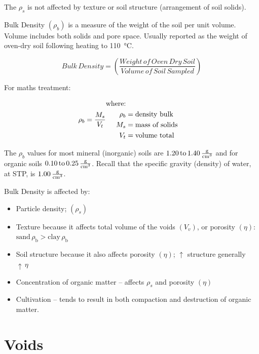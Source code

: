 \documentclass{book}
\begin{document}
The $\rho_s$ is not affected by texture or soil structure (arrangement of soil solids).

Bulk Density $\left(\rho_b\right)$ is a measure of the weight of the soil per unit volume. Volume includes both solids and pore space. Usually reported as the weight of oven-dry soil following heating to \qty{110}{\degreeCelsius}.

\begin{equation}
    Bulk\,Density = \left(\frac{Weight\,of\,Oven\,Dry\,Soil}{Volume\,of\,Soil\,Sampled}\right)
\end{equation}

For maths treatment:

\begin{equation}
    \rho_b = \frac{M_s}{V_t}\quad\\
    \begin{aligned}
    \text{where:}\\
        \rho_b &= \text{density bulk} \\
        M_s &= \text{mass of solids} \\
        V_t &= \text{volume total} \\
    \end{aligned}
\end{equation}

The $\rho_b$ values for most mineral (inorganic) soils are $\ce{1.20 to 1.40 \frac{g}{cm^3}}$ and for organic soils $\ce{0.10 to 0.25 \frac{g}{cm^3}}$. Recall that the specific gravity (density) of water, at STP, is $\ce{1.00 \frac{g}{cm^3}}$.

Bulk Density is affected by:
\begin{itemize}
    \item Particle density; $\left(\rho_s\right)$
    \item Texture because it affects total volume of the voids $\left(V_v\right)$, or porosity $\left(\eta\right)$:  $\text{sand}\,\rho_{\text{b}} > \text{clay}\,\rho_{\text{b}}$
    \item Soil structure because it also affects porosity $\left(\eta\right)$; $\uparrow$  structure generally $\uparrow\,\eta$
    \item Concentration of organic matter – affects $\rho_s$ and porosity $\left(\eta\right)$
    \item Cultivation – tends to result in both compaction and destruction of organic matter.
\end{itemize}

\section{Voids}
\label{voids}
\end{document}
